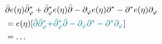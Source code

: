 \documentclass[twoside,openany,12pt]{beautynote}
\begin{document}
  \begin{align*}
    &\bar{\partial} e (\eta) \bar{\partial}^{\ast}_{\varphi} +
    \bar{\partial}^{\ast}_{\varphi} e (\eta) \bar{\partial} - \partial_{\varphi}
    e (\eta) \partial^{\ast} - \partial^{\ast} e (\eta) \partial_{\varphi}
    \\
    &= e (\eta) [{\color[HTML]{008080}\bar{\partial}
    \bar{\partial}^{\ast}_{\varphi} +}
    {\color[HTML]{008080}\bar{\partial}^{\ast}_{\varphi} \bar{\partial} -
    \partial_{\varphi} \partial^{\ast} - \partial^{\ast} \partial_{\varphi}}]  \\
    &= \ldots 
  \end{align*}


\clearpage
\pagestyle{\auxsettings}
\printbibliography[heading=bibintoc]
\end{document}
